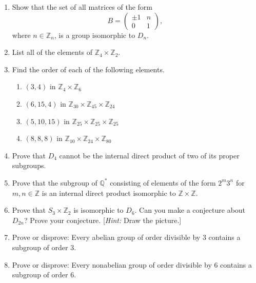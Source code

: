 {\begin{enumerate}
\item
Show that the set of all matrices of the form
\[
B =
\begin{pmatrix}
\pm 1 & n \\
0 & 1
\end{pmatrix},
\]
where $n \in {\mathbb Z}_n$, is a group isomorphic to $D_n$.
 

\item
List all of the elements of ${\mathbb Z}_4 \times {\mathbb Z}_2$.
 

\item
Find the order of each of the following elements.

\begin{enumerate}
 
 \item
$(3, 4)$ in ${\mathbb Z}_4 \times {\mathbb Z}_6$

 \item
$(6, 15, 4)$ in ${\mathbb Z}_{30} \times {\mathbb Z}_{45} \times {\mathbb
Z}_{24}$

 \item
$(5, 10, 15)$ in ${\mathbb Z}_{25} \times {\mathbb Z}_{25} \times {\mathbb
Z}_{25}$

 \item
$(8, 8, 8)$ in ${\mathbb Z}_{10} \times {\mathbb Z}_{24} \times {\mathbb
Z}_{80}$
 
\end{enumerate}
 

\item
Prove that $D_4$ cannot be the internal direct product of two of its
proper subgroups. 
 

\item
Prove that the subgroup of ${\mathbb Q}^\ast$ consisting of elements of
the form $2^m 3^n$ for $m,n \in {\mathbb Z}$ is an internal direct
product isomorphic to ${\mathbb Z} \times {\mathbb Z}$.
 

\item
Prove that $S_3 \times {\mathbb Z}_2$ is isomorphic to $D_6$. Can you
make a conjecture about $D_{2n}$? Prove your conjecture. [{\em Hint:\/}
Draw the picture.] 
 

\item
Prove or disprove: Every abelian group of order divisible by 3
contains a subgroup of order 3.  


\item
Prove or disprove: Every nonabelian group of order divisible by 6
contains a subgroup of order 6. 
 


\end{enumerate}}

